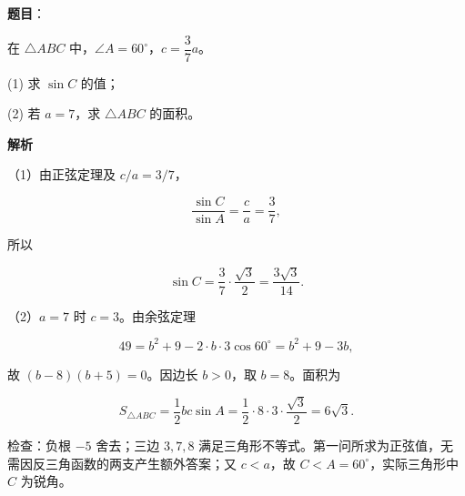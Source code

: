 \begin{answer}

\textbf{题目}：

在 $\triangle ABC$ 中，$\angle A=60^\circ$，$c=\dfrac37a$。

(1) 求 $\sin C$ 的值；

(2) 若 $a=7$，求 $\triangle ABC$ 的面积。

\textbf{解析}

（1）由正弦定理及 $c/a=3/7$，

\nopagebreak[4]
\[\frac{\sin C}{\sin A}=\frac ca=\frac37,\]

所以

\nopagebreak[4]
\[\boxed{\sin C=\frac37\cdot\frac{\sqrt3}{2}=\frac{3\sqrt3}{14}}.\]

（2）$a=7$ 时 $c=3$。由余弦定理

\nopagebreak[4]
\[49=b^2+9-2\cdot b\cdot3\cos60^\circ=b^2+9-3b,\]

故 $(b-8)(b+5)=0$。因边长 $b>0$，取 $b=8$。面积为

\nopagebreak[4]
\[\boxed{S_{\triangle ABC}=\frac12bc\sin A=\frac12\cdot8\cdot3\cdot\frac{\sqrt3}{2}=6\sqrt3}.\]

检查：负根 $-5$ 舍去；三边 $3,7,8$ 满足三角形不等式。第一问所求为正弦值，无需因反三角函数的两支产生额外答案；又 $c<a$，故 $C<A=60^\circ$，实际三角形中 $C$ 为锐角。



\end{answer}
